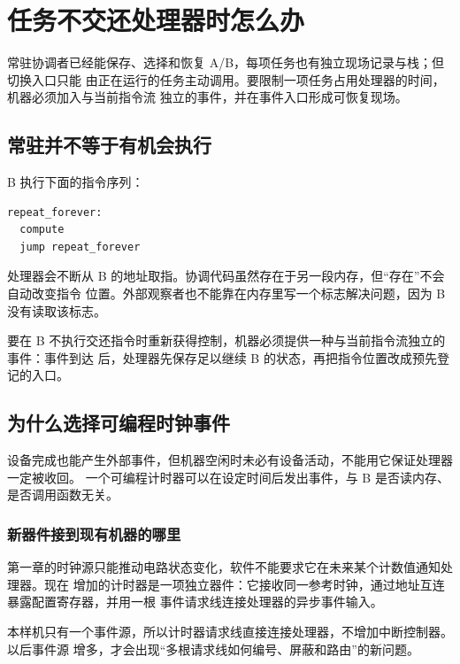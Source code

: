 \chapter{任务不交还处理器时怎么办}

\begin{keyidea}
常驻协调者已经能保存、选择和恢复 A/B，每项任务也有独立现场记录与栈；但切换入口只能
由正在运行的任务主动调用。要限制一项任务占用处理器的时间，机器必须加入与当前指令流
独立的事件，并在事件入口形成可恢复现场。
\end{keyidea}

\section{常驻并不等于有机会执行}

B 执行下面的指令序列：

\begin{lstlisting}
repeat_forever:
  compute
  jump repeat_forever
\end{lstlisting}

处理器会不断从 B 的地址取指。协调代码虽然存在于另一段内存，但“存在”不会自动改变指令
位置。外部观察者也不能靠在内存里写一个标志解决问题，因为 B 没有读取该标志。

要在 B 不执行交还指令时重新获得控制，机器必须提供一种与当前指令流独立的事件：事件到达
后，处理器先保存足以继续 B 的状态，再把指令位置改成预先登记的入口。

\section{为什么选择可编程时钟事件}

设备完成也能产生外部事件，但机器空闲时未必有设备活动，不能用它保证处理器一定被收回。
一个可编程计时器可以在设定时间后发出事件，与 B 是否读内存、是否调用函数无关。

\subsection{新器件接到现有机器的哪里}

第一章的时钟源只能推动电路状态变化，软件不能要求它在未来某个计数值通知处理器。现在
增加的计时器是一项独立器件：它接收同一参考时钟，通过地址互连暴露配置寄存器，并用一根
事件请求线连接处理器的异步事件输入。

本样机只有一个事件源，所以计时器请求线直接连接处理器，不增加中断控制器。以后事件源
增多，才会出现“多根请求线如何编号、屏蔽和路由”的新问题。

